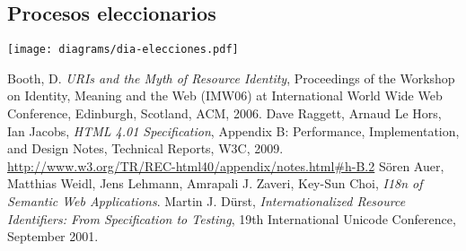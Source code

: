 \documentclass[letterpaper,titlepage]{article}
\begin{document}
\subsection{Procesos eleccionarios}
\begin{center}
  \texttt{[image: diagrams/dia-elecciones.pdf]}
\end{center}

\begin{thebibliography}{99}
 Booth, D.
  {\em URIs and the Myth of Resource Identity},
  Proceedings of the Workshop on Identity, Meaning and the Web (IMW06)
  at International World Wide Web Conference,
  Edinburgh, Scotland, ACM, 2006.
 Dave Raggett, Arnaud Le Hors, Ian Jacobs,
  {\em HTML 4.01 Specification}, Appendix B: Performance,
  Implementation, and Design Notes,
  Technical Reports, W3C, 2009. \\
  {\small\url{http://www.w3.org/TR/REC-html40/appendix/notes.html#h-B.2}}
 Sören Auer, Matthias Weidl, Jens Lehmann, Amrapali
  J. Zaveri, Key-Sun Choi, {\em I18n of Semantic Web Applications}.
 Martin J. Dürst,
  {\em Internationalized Resource Identifiers: From Specification to Testing},
  19th International Unicode Conference, September 2001.
\end{thebibliography}
\end{document}
